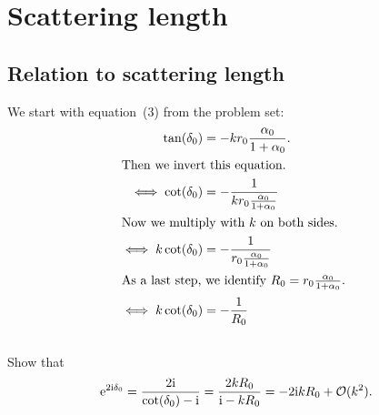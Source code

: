 \documentclass[11pt, english, fleqn, DIV=15, headinclude, BCOR=1.5cm]{scrartcl}
\begin{document}
\section{Scattering length}

\subsection{Relation to scattering length}

We start with equation~(3) from the problem set:
\begin{align*}
    \tan(\delta_0) &= - k r_0 \frac{\alpha_0}{1 + \alpha_0}. \\
    \intertext{%
        Then we invert this equation.
    }
    \iff \cot(\delta_0) &= - \frac{1}{k r_0 \frac{\alpha_0}{1 + \alpha_0}} \\
    \intertext{%
        Now we multiply with $k$ on both sides.
    }
    \iff k \cot(\delta_0) &= - \frac{1}{r_0 \frac{\alpha_0}{1 + \alpha_0}} \\
    \intertext{%
        As a last step, we identify $R_0 = r_0 \frac{\alpha_0}{1 + \alpha_0}$.
    }
    \iff k \cot(\delta_0) &= - \frac{1}{R_0}
\end{align*}

\subsection{}

\begin{problem}
    Show that
    \[
        \mathrm e^{2 \mathrm i \delta_0}
        = \frac{2 \mathrm i}{\cot(\delta_0) - \mathrm i}
        = \frac{2k R_0}{\mathrm i - kR_0}
        = - 2 \mathrm i k R_0 + \mathcal O(k^2).
    \]
\end{problem}
\end{document}
